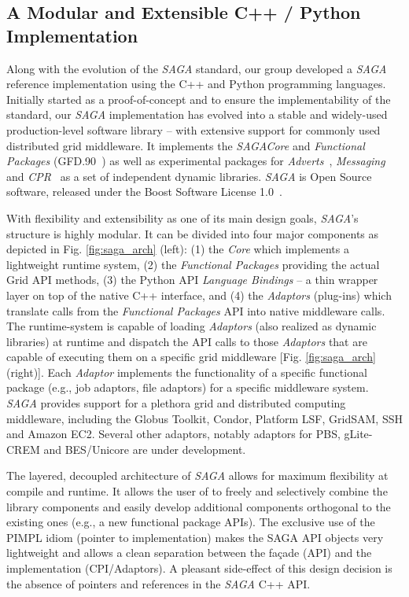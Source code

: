 \documentclass[a4paper,10pt]{article}
\newcommand{\I}[1]{\textit{#1}}
\newcommand{\sagaspec}{\textit{SAGA}\xspace}
\newcommand{\sagaimpl}{\textit{SAGA}\xspace}
\newcommand{\spec}{\sagaspec}
\newcommand{\impl}{\sagaimpl}
\begin{document}
\vspace{-0.8em}


\subsection*{A Modular and Extensible C++ / Python Implementation}
\vspace{-0.6em}

 Along with the evolution of the \spec standard, our group developed a
 \impl reference implementation using the C++ and Python programming
 languages. Initially started as a proof-of-concept and to ensure the
 implementability of the standard, our \impl implementation has
 evolved into a stable and widely-used production-level software
 library -- with extensive support for commonly used distributed grid
 middleware.  It implements the \spec \textit{Core} and
 \textit{Functional Packages} (GFD.90~\cite{ogf-gfd-90}) as well as
 experimental packages for \textit{Adverts}~\cite{ogf-gwd-r-p-xx},
 \textit{Messaging}\cite{ogf-gwd-r-94} and
 \textit{CPR}~\cite{ogf-gwd-r-96} as a set of independent dynamic
 libraries. \impl is Open Source software, released under the Boost
 Software License 1.0~\cite{boost_license_web}. 

 With flexibility and extensibility as one of its main design goals,
 \impl's structure is highly modular. It can be divided into four
 major components as depicted in Fig. \ref{fig:saga_arch} (left): (1)
 the \I{Core} which implements a lightweight runtime system, (2) the
 \I{Functional Packages} providing the actual Grid API methods, (3)
 the Python API \I{Language Bindings} -- a thin wrapper layer on top
 of the native C++ interface, and (4) the \I{Adaptors} (plug-ins)
 which translate calls from the \I{Functional Packages} API into
 native middleware calls.  The runtime-system is capable of loading
 \I{Adaptors} (also realized as dynamic libraries) at runtime and
 dispatch the API calls to those \I{Adaptors} that are capable of
 executing them on a specific grid middleware [Fig.
 \ref{fig:saga_arch} (right)]. Each \I{Adaptor} implements the
 functionality of a specific functional package (e.g., job adaptors,
 file adaptors) for a specific middleware system. \impl provides
 support for a plethora grid and distributed computing middleware,
 including the Globus Toolkit, Condor, Platform LSF, GridSAM, SSH and
 Amazon EC2. Several other adaptors, notably adaptors for PBS,
 gLite-CREM and BES/Unicore are under development. 

 The layered, decoupled architecture of \impl allows for maximum
 flexibility at compile and runtime. It allows the user of to freely
 and selectively combine the library components and easily develop
 additional components orthogonal to the existing ones (e.g., a new
 functional package APIs). The exclusive use of the PIMPL idiom
 (pointer to implementation) makes the SAGA API objects very
 lightweight and allows a clean separation between the fa\c{c}ade
 (API) and the implementation (CPI/Adaptors). A pleasant side-effect
 of this design decision is the absence of pointers and references in
 the \impl C++ API.
\end{document}
